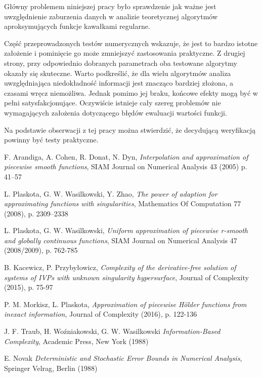 \documentclass[oik, pdftex, man]{mgrwms}
\begin{document}
\mgrclosechapter


\begin{podsumowanie}
    Główny problemem niniejszej pracy było sprawdzenie jak ważne jest uwzględnienie zaburzenia danych w analizie teoretycznej algorytmów aproksymujących funkcje kawałkami regularne. 
    
    Część przeprowadzonych testów numerycznych wskazuje, że jest to bardzo istotne założenie i pominięcie go może zmniejszyć zastosowania praktyczne. Z drugiej strony, przy odpowiednio dobranych parametrach oba testowane algorytmy okazały się skuteczne.
    Warto podkreślić, że dla wielu algorytmów analiza uwzględniająca niedokładność informacji jest znacząco bardziej złożona, a czasami wręcz niemożliwa. Jednak pomimo jej braku, końcowe efekty mogą być w pełni satysfakcjonujące. Oczywiście istnieje cały szereg problemów nie wymagających założenia dotyczącego błędów ewaluacji wartości funkcji.

    Na podstawie obserwacji z tej pracy można stwierdzić, że decydującą weryfikacją powinny być testy praktyczne.
\end{podsumowanie}



%  
\begin{thebibliography}{88}

    F. Arandiga, A. Cohen, R. Donat, N. Dyn,
    \emph{Interpolation and approximation of piecewise smooth functions}, 
    SIAM Journal on Numerical Analysis 43 (2005) p. 41–57

    L. Plaskota, G. W. Wasilkowski, Y. Zhao, 
    \emph{The power of adaption for approximating functions with singularities},
    Mathematics Of Computation 77 (2008), p. 2309–2338

    L. Plaskota, G. W. Wasilkowski, 
    \emph{Uniform approximation of piecewise r-smooth and globally continuous functions}, 
    SIAM Journal on Numerical Analysis 47 (2008/2009), p. 762-785

    B. Kacewicz, P. Przybyłowicz, 
    \emph{Complexity of the derivative-free solution of systems of IVPs with unknown singularity hypersurface}, 
    Journal of Complexity (2015), p. 75-97
    
    P. M. Morkisz, L. Plaskota, 
    \emph{Approximation of piecewise Hölder functions from inexact information}, 
    Journal of Complexity (2016), p. 122-136

    J. F. Traub, H. Woźniakowski, G. W. Wasilkowski
    \emph{Information-Based Complexity}, 
    Academic Press, New York (1988)

    E. Novak
    \emph{Deterministic and Stochastic Error Bounds in Numerical Analysis}, 
    Springer Velrag, Berlin (1988)

\end{thebibliography}
\end{document}
